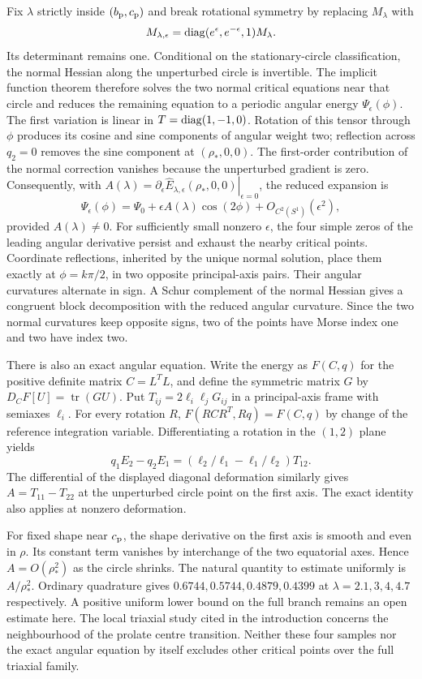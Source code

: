 Fix $\lambda$ strictly inside $(b_{\mathrm p},c_{\mathrm p})$ and break rotational
symmetry by replacing $M_\lambda$ with
\[
 M_{\lambda,\epsilon}
 =\operatorname{diag}(e^\epsilon,e^{-\epsilon},1)M_\lambda.
\]
Its determinant remains one.  Conditional on the stationary-circle
classification, the normal Hessian along the unperturbed circle
is invertible.  The implicit function theorem therefore solves
the two normal critical equations near that circle and reduces
the remaining equation to a periodic angular energy
$\Psi_\epsilon(\phi)$.
The first variation is linear in
$T=\operatorname{diag}(1,-1,0)$.  Rotation of this tensor through $\phi$
produces its cosine and sine components of angular weight two;
reflection across $q_2=0$ removes the sine component at
$(\rho_*,0,0)$.  The first-order contribution of the normal
correction vanishes because the unperturbed gradient is zero.
Consequently, with
$A(\lambda)=\left.\partial_\epsilon
\widehat E_{\lambda,\epsilon}(\rho_*,0,0)\right|_{\epsilon=0}$,
the reduced expansion is
\[
 \Psi_\epsilon(\phi)
 =\Psi_0+\epsilon A(\lambda)\cos(2\phi)
   +O_{C^2(S^1)}(\epsilon^2),
\]
provided $A(\lambda)\ne0$.
For sufficiently small nonzero $\epsilon$, the four simple
zeros of the leading angular derivative persist and exhaust
the nearby critical points.  Coordinate reflections, inherited
by the unique normal solution, place them exactly at
$\phi=k\pi/2$, in two opposite principal-axis pairs.
Their angular curvatures alternate in sign.  A Schur complement
of the normal Hessian gives a congruent block decomposition
with the reduced angular curvature.  Since the two normal
curvatures keep opposite signs, two of the points have Morse
index one and two have index two.

There is also an exact angular equation. Write the energy as $F(C,q)$ for the positive definite matrix $C=L^TL$, and define the symmetric matrix $G$ by $D_CF[U]=\operatorname{tr}(GU)$. Put $T_{ij}=2\ell_i\ell_jG_{ij}$ in a principal-axis frame with semiaxes $\ell_i$. For every rotation $R$, $F(RCR^T,Rq)=F(C,q)$ by change of the reference integration variable. Differentiating a rotation in the $(1,2)$ plane yields
\[
 q_1E_2-q_2E_1=(\ell_2/\ell_1-\ell_1/\ell_2)T_{12}.
\]
The differential of the displayed diagonal deformation similarly gives $A=T_{11}-T_{22}$ at the unperturbed circle point on the first axis. The exact identity also applies at nonzero deformation.

For fixed shape near $c_{\mathrm p}$, the shape derivative on the first axis is smooth and even in $\rho$. Its constant term vanishes by interchange of the two equatorial axes. Hence $A=O(\rho_*^2)$ as the circle shrinks. The natural quantity to estimate uniformly is $A/\rho_*^2$. Ordinary quadrature gives $0.6744,0.5744,0.4879,0.4399$ at $\lambda=2.1,3,4,4.7$ respectively. A positive uniform lower bound on the full branch remains an open estimate here. The local triaxial study cited in the introduction concerns the neighbourhood of the prolate centre transition. Neither these four samples nor the exact angular equation by itself excludes other critical points over the full triaxial family.

